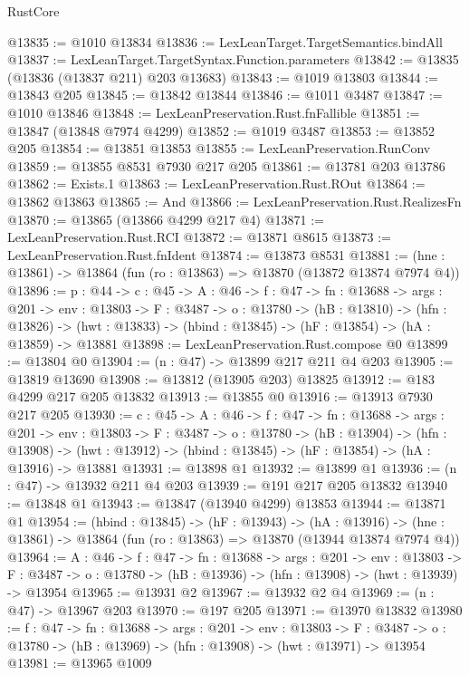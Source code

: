 \begin{lexlean}{RustCore}
\begin{coremodule}
@13835 := @1010 @13834
@13836 := LexLeanTarget.TargetSemantics.bindAll
@13837 := LexLeanTarget.TargetSyntax.Function.parameters
@13842 := @13835 (@13836 (@13837 @211) @203 @13683)
@13843 := @1019 @13803
@13844 := @13843 @205
@13845 := @13842 @13844
@13846 := @1011 @3487
@13847 := @1010 @13846
@13848 := LexLeanPreservation.Rust.fnFallible
@13851 := @13847 (@13848 @7974 @4299)
@13852 := @1019 @3487
@13853 := @13852 @205
@13854 := @13851 @13853
@13855 := LexLeanPreservation.RunConv
@13859 := @13855 @8531 @7930 @217 @205
@13861 := @13781 @203 @13786
@13862 := Exists.{1}
@13863 := LexLeanPreservation.Rust.ROut
@13864 := @13862 @13863
@13865 := And
@13866 := LexLeanPreservation.Rust.RealizesFn
@13870 := @13865 (@13866 @4299 @217 @4)
@13871 := LexLeanPreservation.Rust.RCI
@13872 := @13871 @8615
@13873 := LexLeanPreservation.Rust.fnIdent
@13874 := @13873 @8531
@13881 := (hne : @13861) -> @13864 (fun (ro : @13863) => @13870 (@13872 @13874 @7974 @4))
@13896 := {p : @44} ->
  {c : @45} ->
  {A : @46} ->
  {f : @47} ->
  {fn : @13688} ->
  {args : @201} ->
  {env : @13803} ->
  {F : @3487} ->
  {o : @13780} ->
  (hB : @13810) ->
  (hfn : @13826) -> (hwt : @13833) -> (hbind : @13845) -> (hF : @13854) -> (hA : @13859) -> @13881
@13898 := LexLeanPreservation.Rust.compose @0
@13899 := @13804 @0
@13904 := (n : @47) -> @13899 @217 @211 @4 @203
@13905 := @13819 @13690
@13908 := @13812 (@13905 @203) @13825
@13912 := @183 @4299 @217 @205 @13832
@13913 := @13855 @0
@13916 := @13913 @7930 @217 @205
@13930 := {c : @45} ->
  {A : @46} ->
  {f : @47} ->
  {fn : @13688} ->
  {args : @201} ->
  {env : @13803} ->
  {F : @3487} ->
  {o : @13780} ->
  (hB : @13904) ->
  (hfn : @13908) -> (hwt : @13912) -> (hbind : @13845) -> (hF : @13854) -> (hA : @13916) -> @13881
@13931 := @13898 @1
@13932 := @13899 @1
@13936 := (n : @47) -> @13932 @211 @4 @203
@13939 := @191 @217 @205 @13832
@13940 := @13848 @1
@13943 := @13847 (@13940 @4299) @13853
@13944 := @13871 @1
@13954 := (hbind : @13845) ->
  (hF : @13943) ->
  (hA : @13916) -> (hne : @13861) -> @13864 (fun (ro : @13863) => @13870 (@13944 @13874 @7974 @4))
@13964 := {A : @46} ->
  {f : @47} ->
  {fn : @13688} ->
  {args : @201} ->
  {env : @13803} ->
  {F : @3487} -> {o : @13780} -> (hB : @13936) -> (hfn : @13908) -> (hwt : @13939) -> @13954
@13965 := @13931 @2
@13967 := @13932 @2 @4
@13969 := (n : @47) -> @13967 @203
@13970 := @197 @205
@13971 := @13970 @13832
@13980 := {f : @47} ->
  {fn : @13688} ->
  {args : @201} ->
  {env : @13803} ->
  {F : @3487} -> {o : @13780} -> (hB : @13969) -> (hfn : @13908) -> (hwt : @13971) -> @13954
@13981 := @13965 @1009

\end{coremodule}
\end{lexlean}
